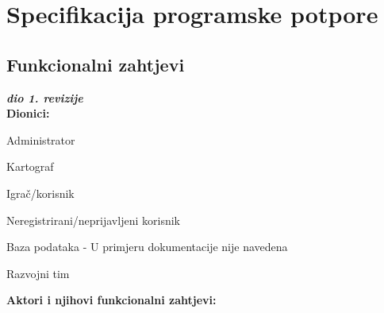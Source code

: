 \chapter{Specifikacija programske potpore}

\section{Funkcionalni zahtjevi}

\textbf{\textit{dio 1. revizije}}\\




\noindent \textbf{Dionici:}

\begin{packed_enum}
	
	\item Administrator
	\item Kartograf			
	\item Igrač/korisnik	
	\item Neregistrirani/neprijavljeni korisnik
	\item Baza podataka - U primjeru dokumentacije nije navedena
	\item Razvojni tim
	
	
\end{packed_enum}

\noindent \textbf{Aktori i njihovi funkcionalni zahtjevi:}


